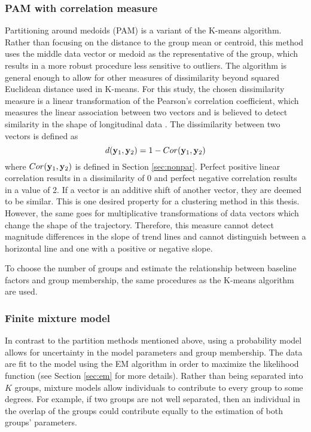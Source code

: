 \subsubsection{PAM with correlation measure}
Partitioning around medoids (PAM) is a variant of the K-means algorithm. Rather than focusing on the distance to the  group mean or centroid, this method uses the middle data vector or medoid as the representative of the group, which results in a more robust procedure less sensitive to outliers. The algorithm is general enough to allow for other measures of dissimilarity beyond squared Euclidean distance used in K-means. For this study, the chosen dissimilarity measure is a linear transformation of the Pearson's correlation coefficient, which measures the linear association between two vectors and is believed to detect similarity in the shape of longitudinal data \cite{chouakria2007,  eisen1998,chiou2008}. The dissimilarity between two vectors is defined as
$$d(\mathbf y_{1},\mathbf y_{2}) = 1-Cor(\mathbf y_{1},\mathbf y_{2})$$
where $Cor(\mathbf y_{1},\mathbf y_{2})$ is defined in Section \ref{sec:nonpar}. Perfect positive linear correlation results in a dissimilarity of 0 and perfect negative correlation results in a value of 2. If a vector is an additive shift of another vector, they are deemed to be similar. This is one desired property for a clustering method in this thesis. However, the same goes for multiplicative transformations of data vectors which change the shape of the trajectory. Therefore, this measure cannot detect magnitude differences in the slope of trend lines and cannot distinguish between a horizontal line and one with a positive or negative slope.

To choose the number of groups and estimate the relationship between baseline factors and group membership, the same procedures as the K-means algorithm are used.

\subsubsection{Finite mixture model}
In contrast to the partition methods mentioned above, using a probability model allows for uncertainty in the model parameters and group membership. The data are fit to the model using the EM algorithm in order to maximize the likelihood function (see Section \ref{sec:em} for more details). Rather than being separated into $K$ groups, mixture models allow individuals to contribute to every group to some degrees. For example, if two groups are not well separated, then an individual in the overlap of the groups could contribute equally to the estimation of both groups' parameters. 

